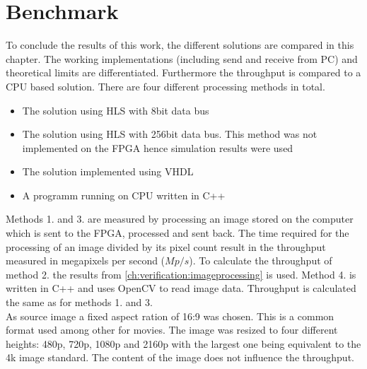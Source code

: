 %
%
\section{Benchmark}\label{ch:benchmark}
To conclude the results of this work, the different solutions are compared in
this chapter. The working implementations (including send and receive from PC)
and theoretical limits are differentiated. Furthermore the throughput is
compared to a CPU based solution.
There are four different processing methods in total.

\begin{itemize}
    \item The solution using HLS with 8bit data bus
    \item The solution using HLS with 256bit data bus. This method was not
    implemented on the FPGA hence simulation results were used
    \item The solution implemented using VHDL
    \item A programm running on CPU written in C++
\end{itemize}

Methods 1. and 3. are measured by processing an image stored on the computer
which is sent to the FPGA, processed and sent back. The time required for the
processing of an image divided by its pixel count result in the throughput
measured in megapixels per second ($Mp/s$). To calculate the throughput of
method 2. the results from \ref{ch:verification:imageprocessing} is used. Method
4. is written in C++ and uses OpenCV to read image data. Throughput is
calculated the same as for methods 1. and 3.
\\

As source image a fixed aspect ration of 16:9 was chosen. This is a common
format used among other for movies. The image was resized to four different
heights: 480p, 720p, 1080p and 2160p with the largest one being equivalent to
the
4k image standard. The content of the image does not influence the throughput.

